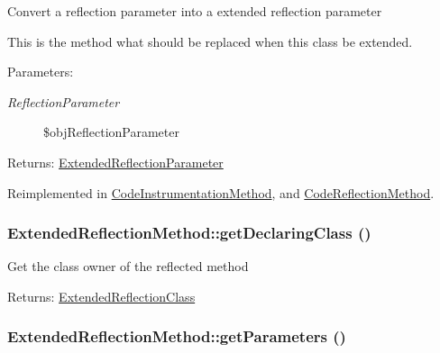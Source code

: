 Convert a reflection parameter into a extended reflection parameter

This is the method what should be replaced when this class be extended.

\begin{Desc}
\item[Parameters:]
\begin{description}
\item[{\em ReflectionParameter}]\$objReflectionParameter \end{description}
\end{Desc}
\begin{Desc}
\item[Returns:]\hyperlink{class_extended_reflection_parameter}{ExtendedReflectionParameter} \end{Desc}


Reimplemented in \hyperlink{class_code_instrumentation_method_d4a17b83d9e1fd997263bc1a9982ae3c}{CodeInstrumentationMethod}, and \hyperlink{class_code_reflection_method_33a3dcd4331a02b37addbc2fa9281af6}{CodeReflectionMethod}.\hypertarget{class_extended_reflection_method_8c818d6302b9518598ccb6138f14ccf5}{
\subsubsection[{getDeclaringClass}]{\setlength{\rightskip}{0pt plus 5cm}ExtendedReflectionMethod::getDeclaringClass ()}}
\label{class_extended_reflection_method_8c818d6302b9518598ccb6138f14ccf5}


Get the class owner of the reflected method

\begin{Desc}
\item[Returns:]\hyperlink{class_extended_reflection_class}{ExtendedReflectionClass} \end{Desc}
\hypertarget{class_extended_reflection_method_2644c74c4379a2aabde434aa5a7d4c64}{
\subsubsection[{getParameters}]{\setlength{\rightskip}{0pt plus 5cm}ExtendedReflectionMethod::getParameters ()}}
\label{class_extended_reflection_method_2644c74c4379a2aabde434aa5a7d4c64}


